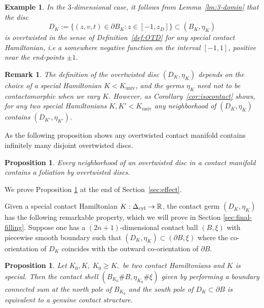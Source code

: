\documentclass[12pt]{paper}
\theoremstyle{plain}
\newtheorem{prop}[theorem]{Proposition}
\newtheorem{ex}[theorem]{Example}
\newtheorem{remark}[theorem]{Remark}
\theoremstyle{definition}
\newcommand{\p}{\partial}
\newcommand{\R}{{\mathbb{R}}}
\newcommand{\cyl}{{\rm cyl}}
\newcommand{\univ}{\mathrm{univ}}
\newcommand{\ot}{\mathrm{ot}}
\numberwithin{figure}{section}
\begin{document}
\begin{ex}
{\rm In the $3$-dimensional case, it follows from Lemma~\ref{lm:3-domin} that the disc
$$
	D_{K} := \{(z, v, t) \in \p B_{K}: z \in   [-1, z_D]\} \subset (B_{K}, \eta_{K})
$$
is overtwisted in the sense of Definition~\ref{def:OTD} for {\em any} special contact Hamiltonian, i.e a somewhere negative function on the interval $[-1,1]$, positive  near the end-points $\pm 1$. }
\end{ex}
\begin{remark}\label{rem:various-ot-discs}{\rm
The definition of the overtwisted disc $(D_K,\eta_K)$ depends on the choice of a special Hamiltonian $K<K_\univ$, and the germs $\eta_K$  need not to be contactomorphic when we vary $K$. However, as Corollary~\ref{cor:isocontact}  shows,  for any two  special Hamiltonians  $K,K'<K_\univ$  any neighborhood of $(D_K,\eta_K)$ contains $(D_{K'},\eta_{K'})$.}
\end{remark}

As the following proposition shows any overtwisted contact manifold contains infinitely many disjoint overtwisted discs.

\begin{prop}\label{prop:neighb-ot}
Every neighborhood of an overtwisted disc in a contact manifold contains a foliation by overtwisted discs.
\end{prop}
We prove Proposition \ref{prop:neighb-ot}    at the end of Section~\ref{sec:effect}.

Given a special contact Hamiltonian $K: \Delta_\cyl \to \R$, 
the contact germ $(D_{K}, \eta_{K})$ has the following remarkable property, which we will
prove in Section \ref{sec:final-filling}.
Suppose one has a $(2n+1)$-dimensional contact ball $(B,\xi)$ with piecewise smooth boundary such that
$(D_{K}, \eta_{K}) \subset (\p B, \xi)$ where the co-orientation of $D_{K}$ coincides with the 
outward co-orientation of $\p B$.

\begin{prop}\label{p:ConnectSumDisc}
Let $K_0, K, \;K_0\geq K,$ be two contact Hamiltonians and $K$ is special. Then
the contact shell $(B_{K_0}\# B, \eta_{K_0} \# \xi)$
given by performing a boundary connected sum at the north pole of $B_{K_0}$ and the south pole of $D_{K} \subset \p B$
is equivalent to a genuine contact structure.
\end{prop}

\end{document}

